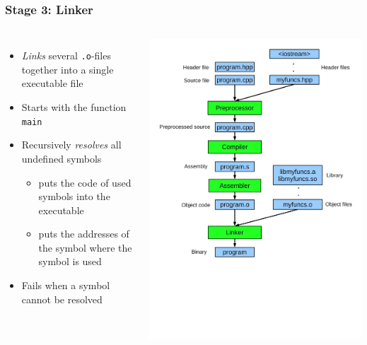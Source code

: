 \documentclass{slides}
\begin{document}
\begin{frame}[fragile]
  \frametitle{Stage 3: Linker}
  \begin{columns}[T,onlytextwidth]
  \begin{itemize}
  \item \emph{Links} several \lstinline!.o!-files together into a
    single executable file
  \item Starts with the function \texttt{main}
  \item Recursively \emph{resolves} all undefined symbols
    \begin{itemize}
    \item puts the code of used symbols into the executable
    \item puts the addresses of the symbol where the symbol is used
    \end{itemize}
  \item Fails when a symbol cannot be resolved
  \end{itemize}
    \includegraphics[height=1.1\textheight]{compilation}
  \end{columns}
\end{frame}
\end{document}
